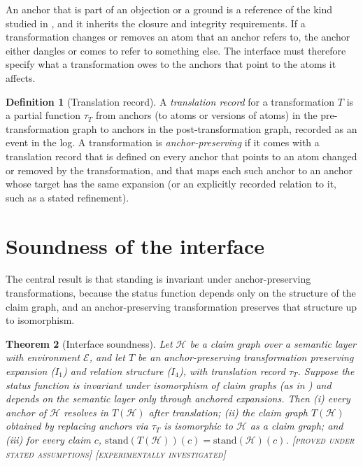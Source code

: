 \documentclass[11pt,twoside,openright]{book}
\theoremstyle{plain}
\newtheorem{theorem}{Theorem}[chapter]
\theoremstyle{definition}
\newtheorem{definition}[theorem]{Definition}
\theoremstyle{remark}
\newcommand{\Proved}{\textup{\textsc{[proved under stated assumptions]}}}
\newcommand{\Tested}{\textup{\textsc{[experimentally investigated]}}}
\begin{document}
An anchor that is part of an objection or a ground is a reference of the kind studied in , and it inherits the closure and integrity requirements. If a transformation changes or removes an atom that an anchor refers to, the anchor either dangles or comes to refer to something else. The interface must therefore specify what a transformation owes to the anchors that point to the atoms it affects.

\begin{definition}[Translation record]\label{def:translation}
A \emph{translation record} for a transformation $T$ is a partial function $\tau_T$ from anchors (to atoms or versions of atoms) in the pre-transformation graph to anchors in the post-transformation graph, recorded as an event in the log. A transformation is \emph{anchor-preserving} if it comes with a translation record that is defined on every anchor that points to an atom changed or removed by the transformation, and that maps each such anchor to an anchor whose target has the same expansion (or an explicitly recorded relation to it, such as a stated refinement).
\end{definition}

\section{Soundness of the interface}

The central result is that standing is invariant under anchor-preserving transformations, because the status function depends only on the structure of the claim graph, and an anchor-preserving transformation preserves that structure up to isomorphism.

\begin{theorem}[Interface soundness]\label{thm:interface}
Let $\mathcal{H}$ be a claim graph over a semantic layer with environment $\mathcal{E}$, and let $T$ be an anchor-preserving transformation preserving expansion ($I_1$) and relation structure ($I_4$), with translation record $\tau_T$. Suppose the status function is invariant under isomorphism of claim graphs (as in ) and depends on the semantic layer only through anchored expansions. Then (i) every anchor of $\mathcal{H}$ resolves in $T(\mathcal{H})$ after translation; (ii) the claim graph $T(\mathcal{H})$ obtained by replacing anchors via $\tau_T$ is isomorphic to $\mathcal{H}$ as a claim graph; and (iii) for every claim $c$, $\mathrm{stand}(T(\mathcal{H}))(c)=\mathrm{stand}(\mathcal{H})(c)$.
\Proved{} \Tested{}
\end{theorem}
\end{document}
